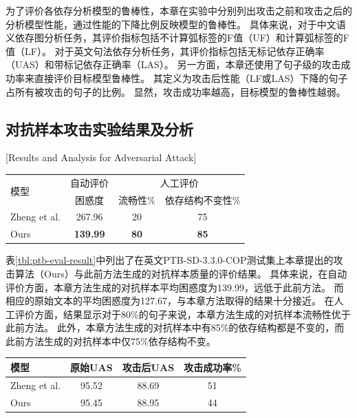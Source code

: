 为了评价各依存分析模型的鲁棒性，本章在实验中分别列出攻击之前和攻击之后的分析模型性能，通过性能的下降比例反映模型的鲁棒性。
具体来说，对于中文语义依存图分析任务，其评价指标包括不计算弧标签的F值（UF）和计算弧标签的F值（LF）。
对于英文句法依存分析任务，其评价指标包括无标记依存正确率（UAS）和带标记依存正确率（LAS）。
另一方面，本章还使用了句子级的攻击成功率来直接评价目标模型鲁棒性。
其定义为攻击后性能（LF或LAS）下降的句子占所有被攻击的句子的比例。
显然，攻击成功率越高，目标模型的鲁棒性越弱。


\subsection{对抗样本攻击实验结果及分析}[Results and Analysis for Adversarial Attack]
\label{sec:chapter3-results}

\begin{table}[htbp]
    \vspace{0.5em}\centering\wuhao
	\begin{tabular}{lccc}
		\toprule[1.5pt]
		\multirow{2}{*}{模型}& 自动评价 & \multicolumn{2}{c}{人工评价} \\
		\cmidrule(r){2-2} \cmidrule(r){3-4}
		& 困惑度 &  流畅性\% & 依存结构不变性\%  \\
		\midrule[1pt]
		Zheng et al. & 267.96 & 20 & 75 \\
		Ours &\bf 139.99 &\bf 80 &\bf 85  \\
		\bottomrule[1.5pt]
	\end{tabular}
\end{table}

表\ref{tbl:ptb-eval-result}中列出了在英文PTB-SD-3.3.0-COP测试集上本章提出的攻击算法（Ours）与此前方法生成的对抗样本质量的评价结果。
具体来说，在自动评价方面，本章方法生成的对抗样本平均困惑度为139.99，远低于此前方法。
而相应的原始文本的平均困惑度为127.67，与本章方法取得的结果十分接近。
在人工评价方面，结果显示对于80\%的句子来说，本章方法生成的对抗样本流畅性优于此前方法。
此外，本章方法生成的对抗样本中有85\%的依存结构都是不变的，而此前方法生成的对抗样本中仅75\%依存结构不变。

\begin{table}[htbp]
    \vspace{0.5em}\centering\wuhao
	\begin{tabular}{lccc}
		\toprule[1.5pt]
		模型& 原始UAS & 攻击后UAS & 攻击成功率\% \\
		\midrule[1pt]
		Zheng et al. & 95.52 & 88.69 & 51 \\
		Ours & 95.45 & 88.95 &  44 \\
		\bottomrule[1.5pt]
	\end{tabular}
\end{table}

